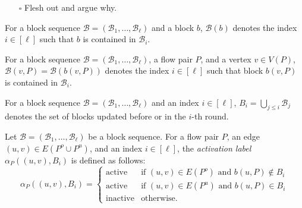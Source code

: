 \documentclass[fontsize=11pt,paper=a4]{book}
\begin{document}
\begin{itemize}
\item[{$\square$}] Flesh out and argue why.
\end{itemize}

\begin{notation}
For a block sequence \(\mathcal{B}=(\mathscr{B}_1,\dots,\mathscr{B}_{\ell})\) and a block \(b\), \(\mathcal{B}(b)\) denotes the index \(i\in[\ell]\) such that \(b\) is contained in \(\mathscr{B}_i\).
\label{org4a6b314}
\end{notation}

\begin{notation}
For a block sequence \(\mathcal{B}=(\mathscr{B}_1,\dots,\mathscr{B}_{\ell})\), a flow pair \(P\), and a vertex \(v\in V(P)\), \(\mathcal{B}(v,P)=\mathcal{B}(b(v,P))\) denotes the index \(i\in[\ell]\) such that block \(b(v,P)\) is contained in \(\mathscr{B}_i\).
\label{org693df5f}
\end{notation}

\begin{notation}
For a block sequence \(\mathcal{B}=(\mathscr{B}_1,\dots,\mathscr{B}_{\ell})\) and an index \(i\in[\ell]\), \(B_i=\bigcup_{j\leq i}\mathscr{B}_j\) denotes the set of blocks updated before or in the \(i\)-th round.
\label{orgcb11a3f}
\end{notation}

\begin{defn}
Let \(\mathcal{B}=(\mathscr{B}_1,\dots,\mathscr{B}_{\ell})\) be a block sequence.
For a flow pair \(P\), an edge \((u,v)\in E(P^o\cup P^u)\), and an index \(i\in[\ell]\), the \emph{activation label} \(\alpha_P((u,v),B_i)\) is defined as follows:
\[\alpha_P((u,v),B_i)=
\begin{cases}
\mathrm{active} & \text{if }(u,v)\in E(P^o)\text{ and }b(u,P)\notin B_i\\
\mathrm{active} & \text{if }(u,v)\in E(P^u)\text{ and }b(u,P)\in B_i\\
\mathrm{inactive} & \text{otherwise}.
\end{cases}\]
\label{org7dedf3e}
\end{defn}
\end{document}
